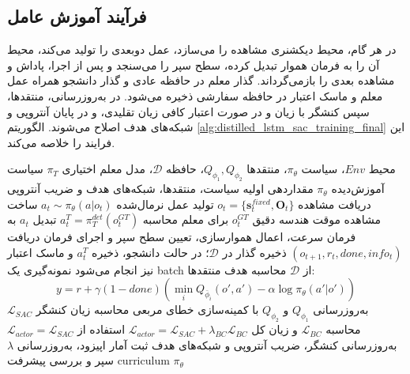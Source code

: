 \subsection{فرآیند آموزش عامل}
\label{subsec:training_process_final}

در هر گام، محیط دیکشنری مشاهده را می‌سازد،  عمل دوبعدی را تولید می‌کند، محیط آن را به فرمان هموار تبدیل کرده، سطح سپر را می‌سنجد و پس از اجرا، پاداش و مشاهده بعدی را بازمی‌گرداند. گذار معلم در حافظه عادی و گذار دانشجو همراه عمل معلم و ماسک اعتبار در حافظه سفارشی ذخیره می‌شود. در به‌روزرسانی، منتقدها، سپس کنشگر با زیان  و در صورت اعتبار کافی زیان تقلیدی، و در پایان آنتروپی و شبکه‌های هدف اصلاح می‌شوند. الگوریتم \ref{alg:distilled_lstm_sac_training_final} این فرایند را خلاصه می‌کند.

\begin{algorithm}[htbp]
	\footnotesize
	\caption{فرآیند آموزش عامل  با سپر غیرفعال و لنگر رفتاری معلم}
	\label{alg:distilled_lstm_sac_training_final}
	\begin{algorithmic}[1]
		\REQUIRE محیط \(Env\)، سیاست \(\pi_\theta\)، منتقدها \(Q_{\phi_1},Q_{\phi_2}\)، حافظه \(\mathcal{D}\)، مدل معلم اختیاری \(\pi_T\)
		\ENSURE سیاست آموزش‌دیده \(\pi_\theta\)
		\STATE مقداردهی اولیه سیاست، منتقدها، شبکه‌های هدف و ضریب آنتروپی
		\STATE دریافت مشاهده \(o_t=\{\mathbf{s}^{fixed}_t,\mathbf{O}_t\}\)
		\STATE تولید عمل نرمال‌شده \(a_t\sim\pi_\theta(a|o_t)\)
		\STATE ساخت مشاهده موقت هندسه دقیق \(o^{GT}_t\) برای معلم
		\STATE محاسبه \(a^T_t=\pi_T^{det}(o^{GT}_t)\)
		\ENDIF
		\STATE تبدیل \(a_t\) به فرمان سرعت، اعمال هموارسازی، تعیین سطح سپر و اجرای فرمان
		\STATE دریافت \((o_{t+1},r_t,done,info_t)\)
		\STATE ذخیره گذار در \(\mathcal{D}\)؛ در حالت دانشجو، ذخیره \(a^T_t\) و ماسک اعتبار نیز انجام می‌شود
		\STATE نمونه‌گیری یک batch از \(\mathcal{D}\)
		\STATE محاسبه هدف منتقدها:
		\[
		y=r+\gamma(1-done)
		\left(
		\min_i Q_{\bar{\phi}_i}(o',a')-
		\alpha\log\pi_\theta(a'|o')
		\right)
		\]
		\STATE به‌روزرسانی \(Q_{\phi_1}\) و \(Q_{\phi_2}\) با کمینه‌سازی خطای مربعی
		\STATE محاسبه زیان کنشگر \(\mathcal{L}_{SAC}\)
		\STATE محاسبه \(\mathcal{L}_{BC}\) و زیان کل \(\mathcal{L}_{actor}=\mathcal{L}_{SAC}+\lambda_{BC}\mathcal{L}_{BC}\)
		\ELSE
		\STATE استفاده از \(\mathcal{L}_{actor}=\mathcal{L}_{SAC}\)
		\ENDIF
		\STATE به‌روزرسانی کنشگر، ضریب آنتروپی و شبکه‌های هدف
		\ENDIF
		\STATE ثبت آمار اپیزود، به‌روزرسانی \(\lambda\) سپر و بررسی پیشرفت curriculum
		\ENDIF
		\ENDFOR
		\RETURN \(\pi_\theta\)
	\end{algorithmic}
\end{algorithm}

